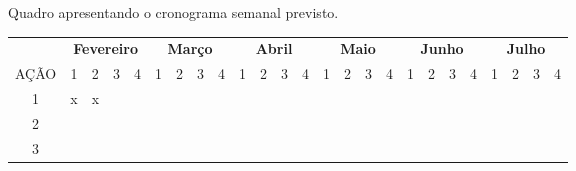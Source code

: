 \begin{quadro}[htb]
\smaller
\caption{\label{cronograma}Quadro apresentando o cronograma semanal previsto.}	
\begin{tabular}{|c|cccc|cccc|cccc|cccc|cccc|cccc|}
\rowcolor{gray}
	& \multicolumn{4}{c|}{\textbf{Fevereiro}} & \multicolumn{4}{c|}{\textbf{Março}} & \multicolumn{4}{|c|}{\textbf{Abril}} & \multicolumn{4}{c|}{\textbf{Maio}} & \multicolumn{4}{c}{\textbf{Junho}} & \multicolumn{4}{c}{\textbf{Julho}} \\
AÇÃO	& \multicolumn{1}{c|}{1} & \multicolumn{1}{c|}{2} & \multicolumn{1}{c|}{3} & 4 & \multicolumn{1}{c|}{1} & \multicolumn{1}{c|}{2} & \multicolumn{1}{c|}{3} & 4 & \multicolumn{1}{c|}{1} & \multicolumn{1}{c|}{2} & \multicolumn{1}{c|}{3} & 4 & \multicolumn{1}{c|}{1} & \multicolumn{1}{c|}{2} & \multicolumn{1}{c|}{3} & 4 & \multicolumn{1}{c|}{1} & \multicolumn{1}{c|}{2} & \multicolumn{1}{c|}{3} & 4 & \multicolumn{1}{c|}{1} & \multicolumn{1}{c|}{2} & \multicolumn{1}{c|}{3} & 4 \\ \hline
1	& \multicolumn{1}{c|}{x} & \multicolumn{1}{c|}{x} & \multicolumn{1}{c|}{}  &   & \multicolumn{1}{c|}{}  & \multicolumn{1}{c|}{}  & \multicolumn{1}{c|}{}  &   & \multicolumn{1}{c|}{}  & \multicolumn{1}{c|}{}  & \multicolumn{1}{c|}{}  &   & \multicolumn{1}{c|}{}  & \multicolumn{1}{c|}{}  & \multicolumn{1}{c|}{}  &   & \multicolumn{1}{c|}{}  & \multicolumn{1}{c|}{}  & \multicolumn{1}{c|}{}  &   & \multicolumn{1}{c|}{}  & \multicolumn{1}{c|}{}  & \multicolumn{1}{c|}{}  &   \\ \hline

2 	& \multicolumn{1}{c|}{} & \multicolumn{1}{c|}{} & \multicolumn{1}{c|}{}  &   & \multicolumn{1}{c|}{}  & \multicolumn{1}{c|}{}  & \multicolumn{1}{c|}{}  &   & \multicolumn{1}{c|}{}  & \multicolumn{1}{c|}{}  & \multicolumn{1}{c|}{}  &   & \multicolumn{1}{c|}{}  & \multicolumn{1}{c|}{}  & \multicolumn{1}{c|}{}  &   & \multicolumn{1}{c|}{}  & \multicolumn{1}{c|}{}  & \multicolumn{1}{c|}{}  &   & \multicolumn{1}{c|}{}  & \multicolumn{1}{c|}{}  & \multicolumn{1}{c|}{}  &   \\ \hline

3 	& \multicolumn{1}{c|}{} & \multicolumn{1}{c|}{} & \multicolumn{1}{c|}{}  &   & \multicolumn{1}{c|}{}  & \multicolumn{1}{c|}{}  & \multicolumn{1}{c|}{}  &   & \multicolumn{1}{c|}{}  & \multicolumn{1}{c|}{}  & \multicolumn{1}{c|}{}  &   & \multicolumn{1}{c|}{}  & \multicolumn{1}{c|}{}  & \multicolumn{1}{c|}{}  &   & \multicolumn{1}{c|}{}  & \multicolumn{1}{c|}{}  & \multicolumn{1}{c|}{}  &   & \multicolumn{1}{c|}{}  & \multicolumn{1}{c|}{}  & \multicolumn{1}{c|}{}  &   \\ \hline


\end{tabular}
\end{quadro}

